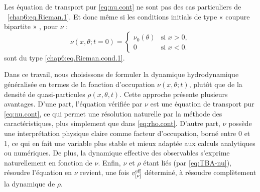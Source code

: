 \medskip

Les équation de transport pur \eqref{eq:nu.cont} ne sont pas  des cas particuliers de ~\eqref{chap6:eq.Rieman.1}. Et donc même si les conditions initials de type  « coupure bipartite » , pour $\nu$ :
\begin{equation}
    \label{eq:nu.cont.init}
    \nu(x,\theta;t=0) = 
    \begin{cases}
        \nu_0(\theta) & \text{si } x > 0, \\
        0 & \text{si } x < 0.
    \end{cases}
\end{equation}
sont du type \eqref{chap6:eq.Rieman.cond.1}.%

\medskip

Dans ce travail, nous choisissons de formuler la dynamique hydrodynamique généralisée en termes de la fonction d’occupation $\nu(x,\theta;t)$, plutôt que de la densité de quasi-particules $\rho(x,\theta,t)$. Cette approche présente plusieurs avantages. D’une part, l’équation vérifiée par $\nu$ est une équation de transport pur \eqref{eq:nu.cont}, ce qui permet une résolution naturelle par la méthode des caractéristiques, plus simplement que dans \eqref{eq:rho.cont}. D’autre part, $\nu$ possède une interprétation physique claire comme facteur d'occupation, borné entre 0 et 1, ce qui en fait une variable plus stable et mieux adaptée aux calculs analytiques ou numériques.
De plus, la dynamique effective des observables s’exprime naturellement en fonction de $\nu$.
Enfin, $\nu$ et $\rho$ étant liés (par \eqref{eq:TBA-nu}), résoudre l’équation en $\nu$ revient, une fois $v^{\rm eff}_{[\nu]}$ déterminé, à résoudre complètement la dynamique de $\rho$.


